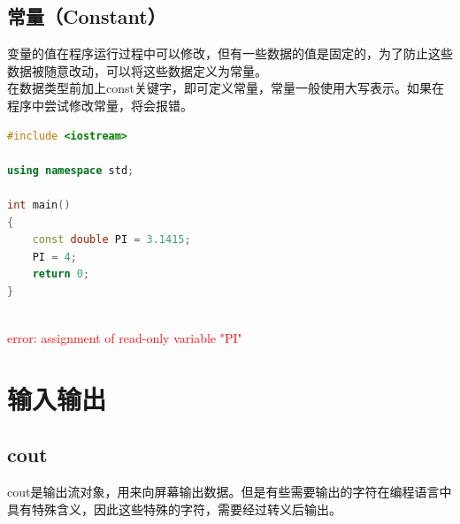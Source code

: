 \vspace{0.5cm}

\subsection{常量（Constant）}

变量的值在程序运行过程中可以修改，但有一些数据的值是固定的，为了防止这些数据被随意改动，可以将这些数据定义为常量。\\

在数据类型前加上const关键字，即可定义常量，常量一般使用大写表示。如果在程序中尝试修改常量，将会报错。\\


\begin{lstlisting}[language=C++]
#include <iostream>

using namespace std;

int main()
{
	const double PI = 3.1415;
	PI = 4;
	return 0;
}
\end{lstlisting}

\begin{tcolorbox}
	\\
	\textcolor{red}{error: assignment of read-only variable "PI"}
\end{tcolorbox}

\newpage

\section{输入输出}

\subsection{cout}

cout是输出流对象，用来向屏幕输出数据。但是有些需要输出的字符在编程语言中具有特殊含义，因此这些特殊的字符，需要经过转义后输出。\\

\begin{table}[H]
	\centering
	\caption{转义字符}
\end{table}

